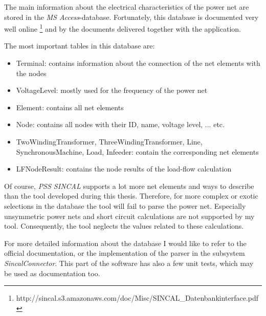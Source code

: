 The main information about the electrical characteristics of the power net are stored in the \emph{MS Access}-database. Fortunately, this database is documented very well online \footnote{http://sincal.s3.amazonaws.com/doc/Misc/SINCAL\_Datenbankinterface.pdf} and by the documents delivered together with the application.

The most important tables in this database are:
\begin{itemize}
	\item Terminal: contains information about the connection of the net elements with the nodes
	\item VoltageLevel: mostly used for the frequency of the power net
	\item Element: contains all net elements
	\item Node: contains all nodes with their ID, name, voltage level, ... etc.
	\item TwoWindingTransformer, ThreeWindingTransformer, Line, SynchronousMachine, Load, Infeeder: contain the corresponding net elements
	\item LFNodeResult: contains the node results of the load-flow calculation
\end{itemize}

Of course, \emph{PSS SINCAL} supports a lot more net elements and ways to describe than the tool developed during this thesis. Therefore, for more complex or exotic selections in the database the tool will fail to parse the power net. Especially unsymmetric power nets and short circuit calculations are not supported by my tool. Consequently, the tool neglects the values related to these calculations.

For more detailed information about the database I would like to refer to the official documentation, or the implementation of the parser in the subsystem \emph{SincalConnector}. This part of the software has also a few unit tests, which may be used as documentation too.